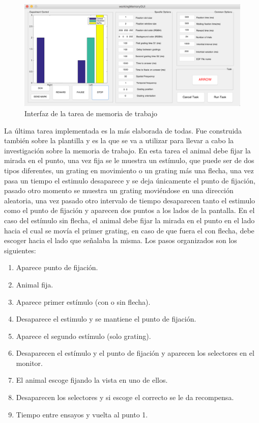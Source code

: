 \documentclass[conference]{IEEEtran}
\begin{document}
\begin{figure}[tp]
  \includegraphics[width=\textwidth]{figures/memory_gui}
  \caption{Interfaz de la tarea de memoria de trabajo}
  \label{figMemoryGui}

\end{figure}

La última tarea implementada es la más elaborada de todas. Fue construida también sobre la plantilla y es la que se va a utilizar para llevar a cabo la investigación sobre la memoria de trabajo. 
En esta tarea el animal debe fijar la mirada en el punto, una vez fija se le muestra un estímulo, que puede ser de dos tipos diferentes, un grating en movimiento o un grating más una flecha, una vez pasa un tiempo el estimulo desaparece y se deja únicamente el punto de fijación, pasado otro momento se muestra un grating moviéndose en una dirección aleatoria, una vez pasado otro intervalo de tiempo desaparecen tanto el estimulo como el punto de fijación y aparecen dos puntos a los lados de la pantalla. En el caso del estímulo sin flecha, el animal debe fijar la mirada en el punto en el lado hacia el cual se movía el primer grating, en caso de que fuera el con flecha, debe escoger  hacia el lado que señalaba la misma.
Los pasos organizados son los siguientes:


\begin{enumerate}
	\item Aparece punto de fijación.
	\item Animal fija.
	\item Aparece primer estímulo (con o sin flecha).
	\item Desaparece el estimulo y se mantiene el punto de fijación.
	\item Aparece el segundo estímulo (solo grating).
	\item Desaparecen el estímulo y el punto de fijación y aparecen los selectores en el monitor.
	\item El animal escoge fijando la vista en uno de ellos.
	\item Desaparecen los selectores y si escoge el correcto se le da recompensa.
	\item Tiempo entre ensayos y vuelta al punto 1.
\end{enumerate}
\end{document}
